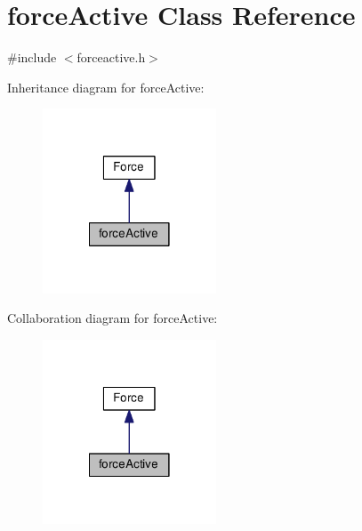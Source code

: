 \hypertarget{classforce_active}{\section{force\-Active Class Reference}
\label{classforce_active}
}


{\ttfamily \#include $<$forceactive.\-h$>$}



Inheritance diagram for force\-Active\-:\nopagebreak
\begin{figure}[H]
\begin{center}
\leavevmode
\includegraphics[width=146pt]{classforce_active__inherit__graph}
\end{center}
\end{figure}


Collaboration diagram for force\-Active\-:\nopagebreak
\begin{figure}[H]
\begin{center}
\leavevmode
\includegraphics[width=146pt]{classforce_active__coll__graph}
\end{center}
\end{figure}
